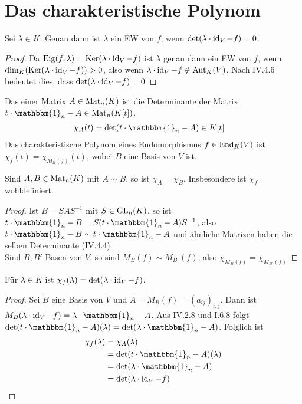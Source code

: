 \section{Das charakteristische Polynom}

\begin{proposition}
	Sei $\lambda\in K$. Genau dann ist $\lambda$ ein EW von $f$, wenn $\det(\lambda\cdot\operatorname{id}_V-f)=0$.
\end{proposition}
\begin{proof}
	Da $\operatorname{Eig}(f,\lambda)=\operatorname{Ker}(\lambda\cdot\operatorname{id}_V-f)$ ist $\lambda$ genau dann ein EW von $f$, wenn $\dim_K(\operatorname{Ker}(\lambda\cdot\operatorname{id}_V-f))>0$, also wenn $\lambda\cdot\operatorname{id}_V-f\notin\operatorname{Aut}_K(V)$. Nach IV.4.6 bedeutet dies, dass $\det(\lambda\cdot\operatorname{id}_V-f)=0$ %
\end{proof}

\begin{definition}
	Das  einer Matrix $A\in\operatorname{Mat}_n(K)$ ist die Determinante der Matrix $t\cdot \mathbbm{1}_n-A\in\Mat_n(K[t])$. 
	\begin{align}
		\chi_A(t)&=\det(t\cdot \mathbbm{1}_n-A)\in K[t] \notag
	\end{align}
	Das charakteristische Polynom eines Endomorphismus $f\in\operatorname{End}_K(V)$ ist $\chi_f(t)=\chi_{M_B(f)}(t)$, wobei $B$ eine Basis von $V$ ist.
\end{definition}

\begin{proposition}
	Sind $A,B\in\operatorname{Mat}_n(K)$ mit $A\sim B$, so ist $\chi_A=\chi_B$. Insbesondere ist $\chi_f$ wohldefiniert.
\end{proposition}
\begin{proof}
	Ist $B=SAS^{-1}$ mit $S\in\operatorname{GL}_n(K)$, so ist $t\cdot \mathbbm{1}_n-B = S(t\cdot \mathbbm{1}_n-A)S^{-1}$, also $t\cdot \mathbbm{1}_n-B\sim t\cdot \mathbbm{1}_n-A$ und ähnliche Matrizen haben die selben Determinante (IV.4.4). \\
	Sind $B,B'$ Basen von $V$, so sind $M_B(f)\sim M_{B'}(f)$, also $\chi_{M_B(f)}=\chi_{M_{B'}(f)}$ %
\end{proof}

\begin{lemma}
	Für $\lambda\in K$ ist $\chi_f(\lambda)=\det(\lambda\cdot\operatorname{id}_V-f)$.
\end{lemma}
\begin{proof}
	Sei $B$ eine Basis von $V$ und $A=M_B(f)=(a_{ij})_{i,j}$. Dann ist $M_B(\lambda\cdot\id_V-f)= \lambda\cdot \mathbbm{1}_n-A$. Aus IV.2.8 und I.6.8 folgt $\det(t\cdot \mathbbm{1}_n-A)(\lambda)=\det(\lambda\cdot \mathbbm{1}_n-A)$. Folglich ist 
	\begin{align}
		\chi_f(\lambda)&=\chi_A(\lambda)\notag \\
		&=\det(t\cdot \mathbbm{1}_n-A)(\lambda)\notag \\
		&=\det(\lambda\cdot \mathbbm{1}_n-A)\notag \\
		&= \det(\lambda\cdot\id_V-f) \notag
	\end{align}
\end{proof}

